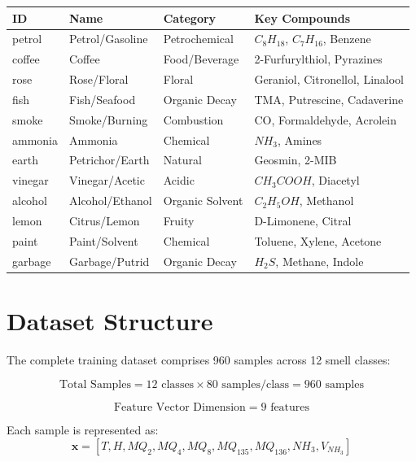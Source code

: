 \documentclass[10pt]{article}
\begin{document}
\begin{table}[H]
\centering
\small
\begin{tabular}{|l|l|l|l|}
\hline
\textbf{ID} & \textbf{Name} & \textbf{Category} & \textbf{Key Compounds} \\
\hline
petrol & Petrol/Gasoline & Petrochemical & $C_8H_{18}$, $C_7H_{16}$, Benzene \\
coffee & Coffee & Food/Beverage & 2-Furfurylthiol, Pyrazines \\
rose & Rose/Floral & Floral & Geraniol, Citronellol, Linalool \\
fish & Fish/Seafood & Organic Decay & TMA, Putrescine, Cadaverine \\
smoke & Smoke/Burning & Combustion & CO, Formaldehyde, Acrolein \\
ammonia & Ammonia & Chemical & $NH_3$, Amines \\
earth & Petrichor/Earth & Natural & Geosmin, 2-MIB \\
vinegar & Vinegar/Acetic & Acidic & $CH_3COOH$, Diacetyl \\
alcohol & Alcohol/Ethanol & Organic Solvent & $C_2H_5OH$, Methanol \\
lemon & Citrus/Lemon & Fruity & D-Limonene, Citral \\
paint & Paint/Solvent & Chemical & Toluene, Xylene, Acetone \\
garbage & Garbage/Putrid & Organic Decay & $H_2S$, Methane, Indole \\
\hline
\end{tabular}
\end{table}

\section{Dataset Structure}

The complete training dataset comprises 960 samples across 12 smell classes:

\begin{equation}
\text{Total Samples} = 12 \text{ classes} \times 80 \text{ samples/class} = 960 \text{ samples}
\end{equation}

\begin{equation}
\text{Feature Vector Dimension} = 9 \text{ features}
\end{equation}

Each sample is represented as:
\[
\mathbf{x} = [T, H, MQ_2, MQ_4, MQ_8, MQ_{135}, MQ_{136}, NH_3, V_{NH_3}]
\]
\end{document}
